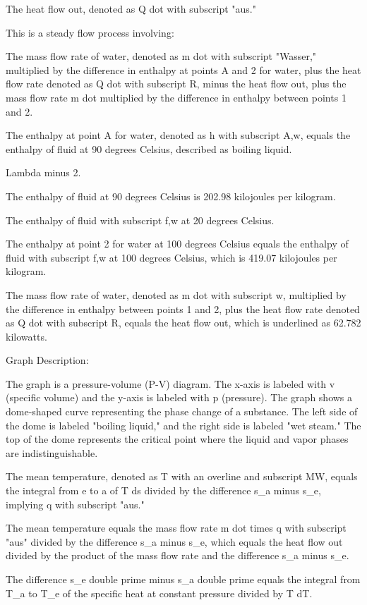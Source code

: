 The heat flow out, denoted as Q dot with subscript "aus."

This is a steady flow process involving:

The mass flow rate of water, denoted as m dot with subscript "Wasser," multiplied by the difference in enthalpy at points A and 2 for water, plus the heat flow rate denoted as Q dot with subscript R, minus the heat flow out, plus the mass flow rate m dot multiplied by the difference in enthalpy between points 1 and 2.

The enthalpy at point A for water, denoted as h with subscript A,w, equals the enthalpy of fluid at 90 degrees Celsius, described as boiling liquid.

Lambda minus 2.

The enthalpy of fluid at 90 degrees Celsius is 202.98 kilojoules per kilogram.

The enthalpy of fluid with subscript f,w at 20 degrees Celsius.

The enthalpy at point 2 for water at 100 degrees Celsius equals the enthalpy of fluid with subscript f,w at 100 degrees Celsius, which is 419.07 kilojoules per kilogram.

The mass flow rate of water, denoted as m dot with subscript w, multiplied by the difference in enthalpy between points 1 and 2, plus the heat flow rate denoted as Q dot with subscript R, equals the heat flow out, which is underlined as 62.782 kilowatts.

Graph Description:

The graph is a pressure-volume (P-V) diagram. The x-axis is labeled with v (specific volume) and the y-axis is labeled with p (pressure). The graph shows a dome-shaped curve representing the phase change of a substance. The left side of the dome is labeled "boiling liquid," and the right side is labeled "wet steam." The top of the dome represents the critical point where the liquid and vapor phases are indistinguishable.

The mean temperature, denoted as T with an overline and subscript MW, equals the integral from e to a of T ds divided by the difference s_a minus s_e, implying q with subscript "aus."

The mean temperature equals the mass flow rate m dot times q with subscript "aus" divided by the difference s_a minus s_e, which equals the heat flow out divided by the product of the mass flow rate and the difference s_a minus s_e.

The difference s_e double prime minus s_a double prime equals the integral from T_a to T_e of the specific heat at constant pressure divided by T dT.

